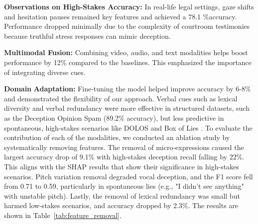 \documentclass[11pt]{article}
\begin{document}

\textbf{Observations on High-Stakes Accuracy:} In real-life legal settings, gaze shifts and hesitation pauses remained key features and achieved a 78.1 \%accuracy. Performance dropped minimally due to the complexity of courtroom testimonies because truthful stress responses can mimic deception. 

\textbf{Multimodal Fusion:} Combining video, audio, and text modalities helps boost performance by 12\% compared to the baselines. This emphasized the importance of integrating diverse cues. 

\textbf{Domain} \textbf{Adaptation:} Fine-tuning the model helped improve accuracy by 6-8\% and demonstrated the flexibility of our approach. Verbal cues such as lexical diversity and verbal redundancy were more effective in structured datasets, such as the Deception Opinion Spam \citep{ott2011finding} (89.2\% accuracy), but less predictive in spontaneous, high-stakes scenarios like DOLOS and Box of Lies \citep{soldner2019box}. To evaluate the contribution of each of the modalities, we conducted an ablation study by systematically removing features. The removal of micro-expressions caused the largest accuracy drop of 9.1\% with high-stakes deception recall falling by 22\%. This aligns with the SHAP results that show their significance in high-stakes scenarios. Pitch variation removal degraded vocal deception, and the F1 score fell from 0.71 to 0.59, particularly in spontaneous lies (e.g., "I didn't see anything" with unstable pitch). Lastly, the removal of lexical redundancy was small but harmed low-stakes scenarios, and accuracy dropped by 2.3\%. The results are shown in Table~\ref{tab:feature_removal}. 
\end{document}
